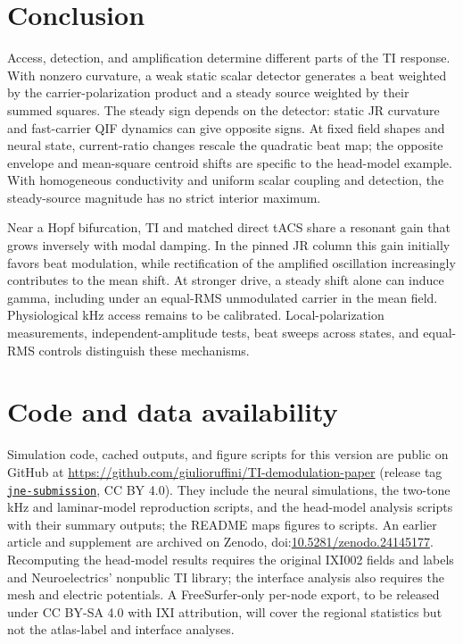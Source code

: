 \documentclass[a4paper]{article}
\begin{document}
\FloatBarrier
\section{Conclusion}
Access, detection, and amplification determine different parts of the TI response. With nonzero curvature, a weak static
scalar detector generates a beat weighted by the carrier-polarization product
and a steady source weighted by their summed squares. The steady sign depends on the detector: static JR
curvature and fast-carrier QIF dynamics can give opposite signs. At fixed
field shapes and neural state, current-ratio changes rescale the quadratic beat map; the opposite
envelope and mean-square centroid shifts are specific to the head-model example.
With homogeneous conductivity and uniform scalar coupling and detection,
the steady-source magnitude has no strict interior maximum.

Near a Hopf bifurcation, TI and matched direct tACS share a resonant gain that
grows inversely with modal damping. In the pinned JR column this gain initially
favors beat modulation, while rectification of the amplified oscillation
increasingly contributes to the mean shift.
At stronger drive, a steady shift alone can induce gamma, including under an
equal-RMS unmodulated carrier in the mean field. Physiological kHz access remains
to be calibrated. Local-polarization measurements, independent-amplitude tests,
beat sweeps across states, and equal-RMS controls distinguish these mechanisms.

\section*{Code and data availability}
\begin{sloppypar}
Simulation code, cached outputs, and figure scripts for this version are public on
GitHub at\newline
{\small\url{https://github.com/giulioruffini/TI-demodulation-paper}}
(release tag \href{https://github.com/giulioruffini/TI-demodulation-paper/tree/jne-submission}{\texttt{jne-submission}},
CC BY 4.0). They include the neural simulations, the two-tone kHz and laminar-model
reproduction scripts, and the head-model analysis scripts with their summary outputs;
the README maps figures to scripts. An earlier article and supplement are archived
on Zenodo, doi:\href{https://doi.org/10.5281/zenodo.24145177}{10.5281/zenodo.24145177}.
Recomputing the head-model results requires the original IXI002 fields and labels and
Neuroelectrics' nonpublic TI library; the interface analysis also requires the mesh and
electric potentials. A FreeSurfer-only per-node export, to be released under
CC BY-SA 4.0 with IXI attribution, will cover the regional statistics but not the
atlas-label and interface analyses.
\end{sloppypar}
\end{document}
